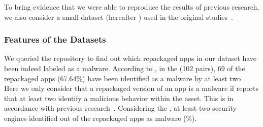 To bring evidence that we were able to reproduce the results of previous research, we also consider a small dataset (hereafter \sds)
used in the original studies~\cite{DBLP:conf/wcre/BaoLL18,DBLP:journals/jss/CostaMMSSBNR22}.







\subsubsection{Features of the Datasets}
 
We queried the \vt repository to find out which repackaged apps in our
dataset have been indeed labeled as a malware.
According to \vt, in the \sds (102 pairs),
69 of the repackaged apps (67.64\%) have been identified as a malware by at least two
\ses. Here we only consider that a repackaged version of an app is a malware if \vt reports that at least
two \ses identify a malicious behavior within the asset. This is in accordance with previous research~\cite{vt-label,DBLP:journals/ese/KhanmohammadiEH19}. Considering the \cds, at least two security engines identified \malwares out of the \apps repackaged apps as malware (\malwaresP\%).

